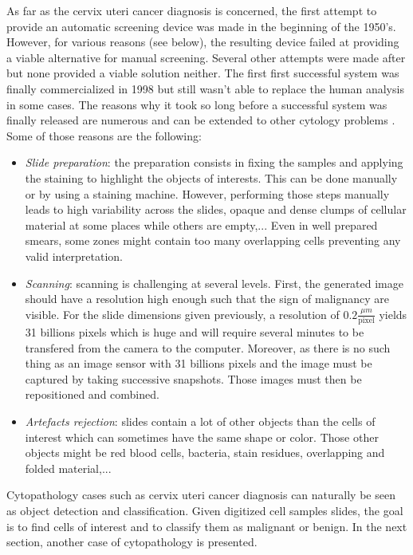 As far as the cervix uteri cancer diagnosis is concerned, the first attempt to provide an automatic screening device was made in the beginning of the 1950's. However, for various reasons (see below), the resulting device failed at providing a viable alternative for manual screening. Several other attempts were made after but none provided a viable solution neither. The first first successful system was finally commercialized in 1998 but still wasn't able to replace the human analysis in some cases. The reasons why it took so long before a successful system was finally released are numerous and can be extended to other cytology problems \cite{bengtsson2014screening}. Some of those reasons are the following:

\begin{itemize}
	\item \textit{Slide preparation}: the preparation consists in fixing the samples and applying the staining to highlight the objects of interests. This can be done manually or by using a staining machine. However, performing those steps manually leads to high variability across the slides, opaque and dense clumps of cellular material at some places while others are empty,... Even in well prepared smears, some zones might contain too many overlapping cells preventing any valid interpretation. 
	\item \textit{Scanning}: scanning is challenging at several levels. First, the generated image should have a resolution high enough such that the sign of malignancy are visible. For the slide dimensions given previously, a resolution of $0.2 \frac{\mu m}{\text{pixel}}$ yields 31 billions pixels which is huge and will require several minutes to be transfered from the camera to the computer. Moreover, as there is no such thing as an image sensor with 31 billions pixels and the image must be captured by taking successive snapshots. Those images must then be repositioned and combined.
	\item \textit{Artefacts rejection}: slides contain a lot of other objects than the cells of interest which can sometimes have the same shape or color. Those other objects might be red blood cells, bacteria, stain residues, overlapping and folded material,... 
\end{itemize}

Cytopathology cases such as cervix uteri cancer diagnosis can naturally be seen as object detection and classification. Given digitized cell samples slides, the goal is to find cells of interest and to classify them as malignant or benign. In the next section, another case of cytopathology is presented.

